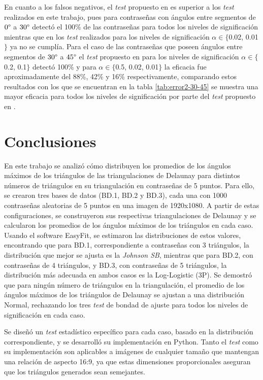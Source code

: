 \documentclass[12pt]{report}
\begin{document}
	En cuanto a los falsos negativos, el \textit{test} propuesto en \cite{13} es superior a los \textit{test} realizados en este trabajo, pues para contraseñas con ángulos entre segmentos de  $0\degree$ a $30\degree$ detectó el 100\% de las contraseñas para todos los niveles de significación mientras que en los \textit{test} realizados para los niveles de significación  $\alpha \in \{$0.02, 0.01$\}$ ya no se cumplía. Para el caso de las contraseñas que poseen ángulos entre segmentos de $30\degree$ a $45\degree$ el \textit{test} propuesto en \cite{13} para los niveles de significación $\alpha \in \{$0.2, 0.1$\}$
	detectó 100\% y para $\alpha \in \{$0.5, 0.02, 0.01$\}$ la eficacia fue aproximadamente  del 88\%, 42\% y 16\% respectivamente, comparando estos resultados con los que se encuentran en la tabla \ref{tab:error2-30-45} 
	se muestra una mayor eficacia para todos los niveles de significación por parte del \textit{test} propuesto en \cite{13}.

\chapter{Conclusiones }
En este trabajo se analizó cómo distribuyen los promedios de los ángulos máximos de los triángulos de las triangulaciones de Delaunay para distintos números de triángulos en su triangulación en contraseñas de 5 puntos. Para ello, se crearon tres bases de datos (BD.1, BD.2 y BD.3), cada una con 1000 contraseñas aleatorias de 5 puntos en una imagen de 1920x1080. A partir de estas configuraciones, se construyeron sus respectivas triangulaciones de Delaunay y se calcularon los promedios de los ángulos máximos de los triángulos en cada caso. Usando el software EasyFit, se estimaron las distribuciones de estos valores, encontrando que para BD.1, correspondiente a contraseñas con 3 triángulos, la distribución que mejor se ajusta es la \textit{Johnson SB}, mientras que para BD.2, con contraseñas de 4 triángulos, y BD.3, con contraseñas de 5 triángulos, la distribución más adecuada en ambos casos es la Log-Logistic (3P). Se demostró que para ningún número de  triángulos en la triangulación, el promedio de los ángulos máximos de los triángulos de Delaunay  se ajustan a una distribución Normal, rechazando los tres \textit{test} de bondad de ajuste para todos los niveles de significación en cada caso.

Se diseñó un \textit{test} estadístico específico para cada caso, basado en la distribución correspondiente, y se desarrolló su implementación en Python. Tanto el \textit{test} como su implementación son aplicables a imágenes de cualquier tamaño que mantengan una relación de aspecto 16:9, ya que estas dimensiones proporcionales aseguran que los triángulos generados sean semejantes. 
\end{document}
